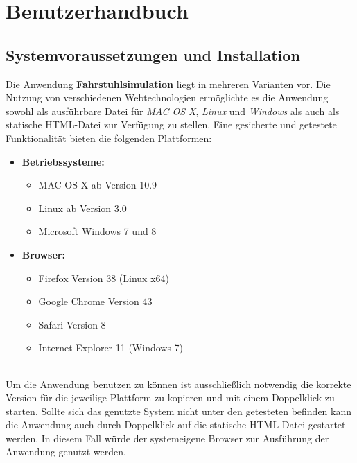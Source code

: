 \part{Benutzerhandbuch}
\chapter{Systemvoraussetzungen und Installation}
Die Anwendung \textbf{Fahrstuhlsimulation} liegt in mehreren Varianten vor. Die Nutzung von verschiedenen Webtechnologien ermöglichte es die Anwendung sowohl als ausführbare Datei für \textit{MAC OS X}, \textit{Linux} und \textit{Windows} als auch als statische HTML-Datei zur Verfügung zu stellen. Eine gesicherte und getestete Funktionalität bieten die folgenden Plattformen:

\begin{itemize}
	\item \textbf{Betriebssysteme:}
	\begin{itemize}
		\item MAC OS X ab Version 10.9
		\item Linux ab Version 3.0
		\item Microsoft Windows 7 und 8
	\end{itemize}
	\item \textbf{Browser:}
	\begin{itemize}
		\item Firefox Version 38 (Linux x64)
		\item Google Chrome Version 43
		\item Safari Version 8
		\item Internet Explorer 11 (Windows 7)
	\end{itemize}
\end{itemize}
\paragraph{}
Um die Anwendung benutzen zu können ist ausschließlich notwendig die korrekte Version für die jeweilige Plattform zu kopieren und mit einem Doppelklick zu starten. Sollte sich das genutzte System nicht unter den getesteten befinden kann die Anwendung auch durch Doppelklick auf die statische HTML-Datei gestartet werden. In diesem Fall würde der systemeigene Browser zur Ausführung der Anwendung genutzt werden.


